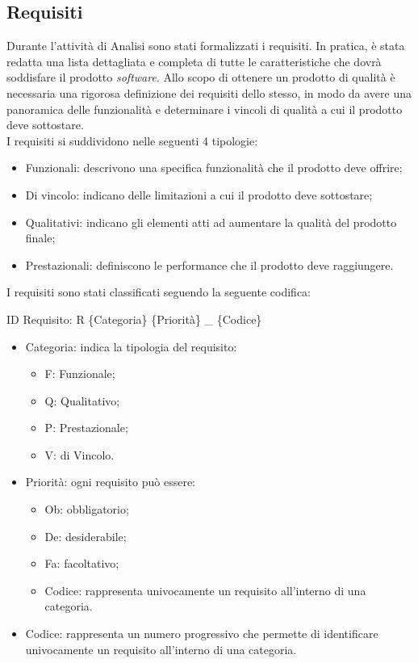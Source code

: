 
\subsection{Requisiti}
Durante l'attività di Analisi sono stati formalizzati i requisiti. In pratica, è stata redatta una lista dettagliata e completa di tutte le caratteristiche che dovrà soddisfare il prodotto \emph{software}. 
Allo scopo di ottenere un prodotto di qualità è necessaria una rigorosa definizione dei requisiti dello stesso, in modo da avere una panoramica delle funzionalità e determinare i vincoli di qualità a cui il prodotto deve sottostare. \\
I requisiti si suddividono nelle seguenti 4 tipologie: \begin{itemize}
    \item Funzionali: descrivono una specifica funzionalità che il prodotto deve offrire;
    \item Di vincolo: indicano delle limitazioni a cui il prodotto deve sottostare;
    \item Qualitativi: indicano gli elementi atti ad aumentare la qualità del prodotto finale;
    \item Prestazionali: definiscono le performance che il prodotto deve raggiungere.
\end{itemize}

I requisiti sono stati classificati seguendo la seguente codifica:
\begin{center}
ID Requisito: R \{Categoria\} \{Priorità\}
\_ \{Codice\}
\end{center}
\begin{itemize}
    \item Categoria: indica la tipologia del requisito:
        \begin{itemize}
            \item F: Funzionale;
            \item Q: Qualitativo;
            \item P: Prestazionale;
            \item V: di Vincolo.
        \end{itemize}
        \item Priorità: ogni requisito può essere:
        \begin{itemize}
            \item Ob: obbligatorio;
            \item De: desiderabile;
            \item Fa: facoltativo;
            \item Codice: rappresenta univocamente un requisito all’interno di una categoria.
        \end{itemize}
        \item Codice: rappresenta un numero progressivo che permette di identificare univocamente un requisito all’interno di una categoria.
\end{itemize}

